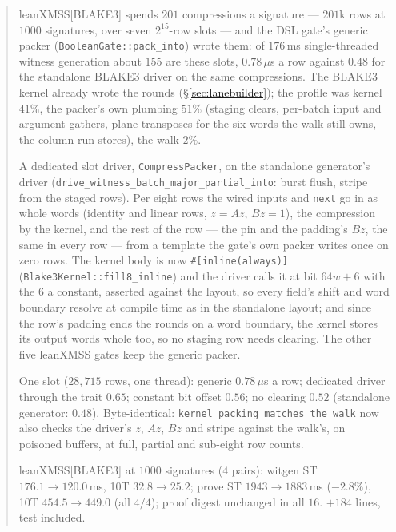 \documentclass[11pt]{article}
\newcommand{\code}[1]{\texttt{#1}}
\newenvironment{optsummary}{%
  \begin{quote}\small
  \begin{description}
  \setlength{\itemsep}{1pt}\setlength{\parsep}{0pt}\setlength{\topsep}{2pt}
}{%
  \end{description}
  \end{quote}
}
\begin{document}
\begin{optsummary}
\item[Baseline:] leanXMSS[BLAKE3] spends $201$ compressions a signature --- $201$k rows at $1000$ signatures, over seven $2^{15}$-row slots --- and the DSL gate's generic packer (\code{BooleanGate::pack\_into}) wrote them: of $176\,$ms single-threaded witness generation about $155$ are these slots, $0.78\,\mu$s a row against $0.48$ for the standalone BLAKE3 driver on the same compressions. The BLAKE3 kernel already wrote the rounds (\S\ref{sec:lanebuilder}); the profile was kernel $41\%$, the packer's own plumbing $51\%$ (staging clears, per-batch input and argument gathers, plane transposes for the six words the walk still owns, the column-run stores), the walk $2\%$.
\item[Improvement:] A dedicated slot driver, \code{CompressPacker}, on the standalone generator's driver (\code{drive\_witness\_batch\_major\_partial\_into}: burst flush, stripe from the staged rows). Per eight rows the wired inputs and \code{next} go in as whole words (identity and linear rows, $z=Az$, $Bz=1$), the compression by the kernel, and the rest of the row --- the pin and the padding's $Bz$, the same in every row --- from a template the gate's own packer writes once on zero rows. The kernel body is now \code{\#[inline(always)]} (\code{Blake3Kernel::fill8\_inline}) and the driver calls it at bit $64w+6$ with the $6$ a constant, asserted against the layout, so every field's shift and word boundary resolve at compile time as in the standalone layout; and since the row's padding ends the rounds on a word boundary, the kernel stores its output words whole too, so no staging row needs clearing. The other five leanXMSS gates keep the generic packer.
\item[Mechanism:] One slot ($28{,}715$ rows, one thread): generic $0.78\,\mu$s a row; dedicated driver through the trait $0.65$; constant bit offset $0.56$; no clearing $0.52$ (standalone generator: $0.48$). Byte-identical: \code{kernel\_packing\_matches\_the\_walk} now also checks the driver's $z$, $Az$, $Bz$ and stripe against the walk's, on poisoned buffers, at full, partial and sub-eight row counts.
\item[Result:] leanXMSS[BLAKE3] at $1000$ signatures ($4$ pairs): witgen ST $176.1\to120.0\,$ms, 10T $32.8\to25.2$; prove ST $1943\to1883\,$ms ($-2.8\%$), 10T $454.5\to449.0$ (all $4/4$); proof digest unchanged in all $16$. $+184$ lines, test included.
\end{optsummary}
\end{document}
